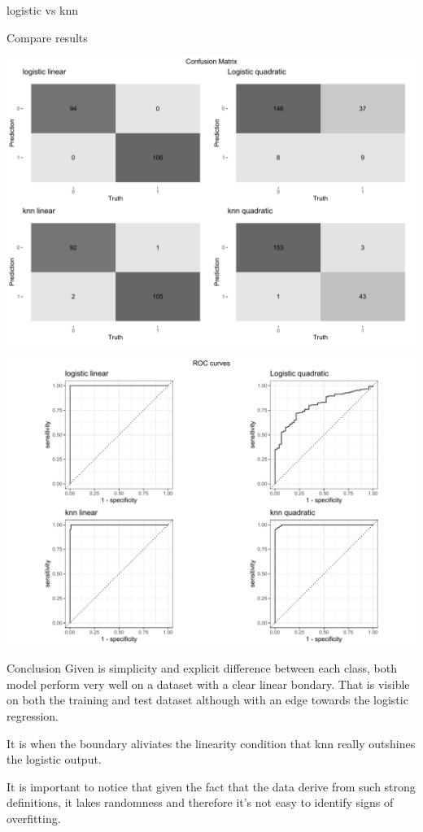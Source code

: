 \documentclass[
  ignorenonframetext,
]{article}
\begin{document}
\begin{frame}[fragile]{logistic vs knn}
\begin{block}{Compare results}
\begin{center}\includegraphics{_main_files/figure-beamer/unnamed-chunk-15-1} \end{center}

\begin{center}\includegraphics{_main_files/figure-beamer/unnamed-chunk-16-1} \end{center}
\end{block}

\begin{block}{Conclusion}
\protect\hypertarget{conclusion}{}
Given is simplicity and explicit difference between each class, both model perform very well on a dataset with a clear linear bondary. That is visible on both the training and test dataset although with an edge towards the logistic regression.

It is when the boundary aliviates the linearity condition that knn really outshines the logistic output.

It is important to notice that given the fact that the data derive from such strong definitions, it lakes randomness and therefore it's not easy to identify signs of overfitting.
\end{block}
\end{frame}
\end{document}
